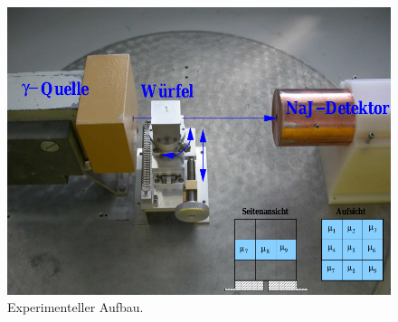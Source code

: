 \begin{figure}[htpb]
  \centering
  \includegraphics[scale=0.3]{bilder/aufbau.png}
  \caption{Experimenteller Aufbau.}
\label{fig:aufbau}
\end{figure}
